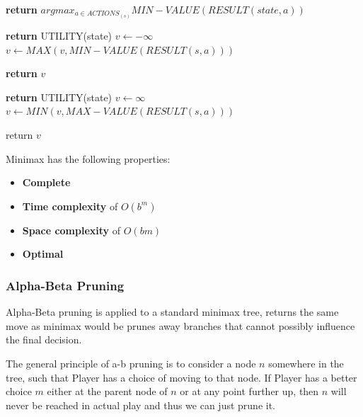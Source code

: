 \documentclass{article}
\begin{document}
\begin{algorithm}
\begin{algorithmic}

    \State \textbf{return} $argmax_{a \in ACTIONS_{(s)}}MIN-VALUE(RESULT(state,a))$
\EndProcedure \newline

        \State \textbf{return} UTILITY(state)
    \EndIf
    \State $v \leftarrow -\infty$
        $v \leftarrow MAX(v,MIN-VALUE(RESULT(s,a)))$
    \EndFor

    \State \textbf{return} $v$ 
\EndProcedure \newline

        \State \textbf{return} UTILITY(state)
        \State $v \leftarrow \infty$
    \EndIf
    \State $v \leftarrow MIN(v,MAX-VALUE(RESULT(s,a)))$
    \EndFor
    
    \State return $v$

\EndProcedure

\end{algorithmic}
\end{algorithm}

Minimax has the following properties:
\begin{itemize}
    \item \textbf{Complete}
    \item \textbf{Time complexity} of $O(b^m)$
    \item \textbf{Space complexity} of $O(bm)$
    \item \textbf{Optimal}
\end{itemize}

\subsubsection{Alpha-Beta Pruning}

Alpha-Beta pruning is applied to a standard minimax tree, returns the same move as minimax would be prunes away branches that cannot possibly influence the final decision.

The general principle of a-b pruning is to consider a node $n$ somewhere in the tree, such that Player has a choice of moving to that node. If Player has a better choice $m$ either at the parent node of $n$ or at any point further up, then $n$ will never be reached in actual play and thus we can just prune it.
\end{document}
